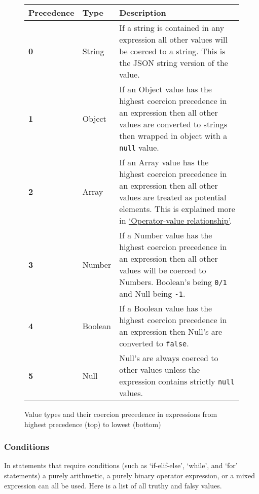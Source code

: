 \documentclass[12pt, letterpaper]{article}
\begin{document}
\begin{figure}[H]
    \begin{center}
        \begin{tabular}{| m{2cm} | m{2cm} | m{6cm} |}
            \hline
            Precedence & Type & Description\\
            \hline
            \textbf{0} & String & If a string is contained in any expression all other values will be coerced to a string. This is the JSON string version of the value.\\
            \hline
            \textbf{1} & Object & If an Object value has the highest coercion precedence in an expression then all other values are converted to strings then wrapped in object with a \verb|null| value.\\
            \hline
            \textbf{2} & Array & If an Array value has the highest coercion precedence in an expression then all other values are treated as potential elements. This is explained more in \hyperref[sec:operatorvaluerel]{`Operator-value relationship'}.\\
            \hline
            \textbf{3} & Number & If a Number value has the highest coercion precedence in an expression then all other values will be coerced to Numbers. Boolean's being \verb|0/1| and Null being \verb|-1|.\\
            \hline
            \textbf{4} & Boolean & If a Boolean value has the highest coercion precedence in an expression then Null's are converted to \verb|false|.\\
            \hline
            \textbf{5} & Null & Null's are always coerced to other values unless the expression contains strictly \verb|null| values.\\
            \hline
        \end{tabular}
    \end{center}
    \caption{Value types and their coercion precedence in expressions from highest precedence (top) to lowest (bottom)}
\end{figure}

\subsubsection{Conditions}

In statements that require conditions (such as `if-elif-else', `while', and `for' statements) a purely arithmetic, a purely binary operator expression, or a mixed expression can all be used. Here is a list of all truthy and falsy values.
\end{document}
